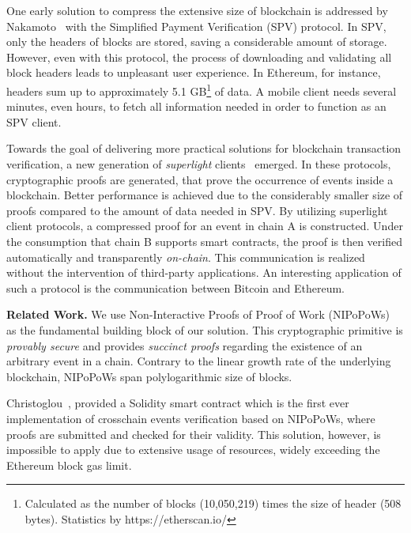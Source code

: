 One early solution to compress the extensive size of blockchain is addressed by
Nakamoto~\cite{nakamoto} with the Simplified Payment Verification (SPV)
protocol. In SPV, only the headers of blocks are stored, saving a
considerable amount of storage.  However, even with this protocol, the process
of downloading and validating all block headers leads to unpleasant user
experience. In Ethereum, for instance, headers sum up to approximately 5.1
GB\footnote{Calculated as the number of blocks (10,050,219) times the size of
header (508 bytes). Statistics by https://etherscan.io/} of data. A mobile
client needs several minutes, even hours, to fetch all information needed in
order to function as an SPV client.

Towards the goal of delivering more practical solutions for blockchain
transaction verification, a new generation of \emph{superlight}
clients~\cite{popow,nipopows,compactsuperblocks, flyclient} emerged. In these
protocols, cryptographic proofs are generated, that prove the occurrence of
events inside a blockchain. Better performance is achieved due to the
considerably smaller size of proofs compared to the amount of data needed in
SPV. By utilizing superlight client protocols, a compressed proof for an event
in chain A is constructed. Under the consumption that chain B supports smart
contracts, the proof is then verified automatically and transparently
\emph{on-chain}. This communication is realized without the intervention of
third-party applications.  An interesting application of such a protocol is the
communication between Bitcoin and Ethereum.

\noindent

\textbf{Related Work.} We use Non-Interactive Proofs of Proof of Work
(NIPoPoWs)~\cite{nipopows, pow-sidechains} as the fundamental building block
of our solution. This cryptographic primitive is \emph{provably secure} and
provides \emph{succinct proofs} regarding the existence of an arbitrary event
in a chain. Contrary to the linear growth rate of the underlying blockchain,
NIPoPoWs span polylogarithmic size of blocks.

Christoglou~\cite{gglou}, provided a Solidity smart contract which is the first
ever implementation of crosschain events verification based on NIPoPoWs, where
proofs are submitted and checked for their validity. This solution, however, is
impossible to apply due to extensive usage of resources, widely exceeding the
Ethereum block gas limit.

\noindent

